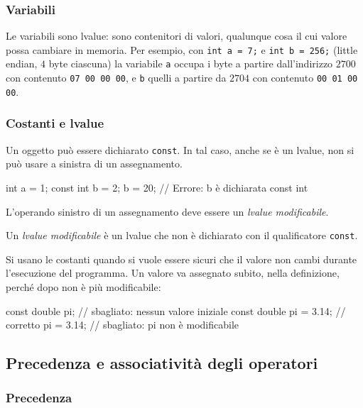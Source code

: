 \documentclass[11pt,a4paper]{article}
\begin{document}
\subsubsection{Variabili}

Le variabili sono lvalue: sono contenitori di valori, qualunque cosa il cui valore possa cambiare in memoria. Per esempio, con \lstinline|int a = 7;| e \lstinline|int b = 256;| (little endian, $4$ byte ciascuna) la variabile \lstinline|a| occupa i byte a partire dall'indirizzo $2700$ con contenuto \texttt{07 00 00 00}, e \lstinline|b| quelli a partire da $2704$ con contenuto \texttt{00 01 00 00}.

\subsubsection{Costanti e lvalue}

Un oggetto può essere dichiarato \lstinline|const|. In tal caso, anche se è un lvalue, non si può usare a sinistra di un assegnamento.

\begin{codice}
int a = 1;
const int b = 2;
b = 20;      // Errore: b è dichiarata const int
\end{codice}

L'operando sinistro di un assegnamento deve essere un \emph{lvalue modificabile}.

\begin{definizione}
Un \emph{lvalue modificabile} è un lvalue che non è dichiarato con il qualificatore \lstinline|const|.
\end{definizione}

Si usano le costanti quando si vuole essere sicuri che il valore non cambi durante l'esecuzione del programma. Un valore va assegnato subito, nella definizione, perché dopo non è più modificabile:

\begin{codice}
const double pi;         // sbagliato: nessun valore iniziale
const double pi = 3.14;  // corretto
pi = 3.14;               // sbagliato: pi non è modificabile
\end{codice}

\subsection{Precedenza e associatività degli operatori}

\subsubsection{Precedenza}
\end{document}
